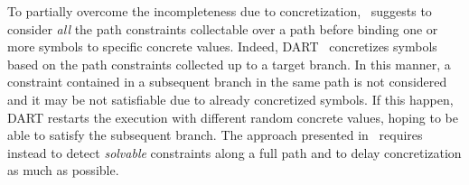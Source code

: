 To partially overcome the incompleteness due to concretization,~\cite{PRV-ISSTA11} suggests to consider {\em all} the path constraints collectable over a path before binding one or more symbols to specific concrete values. Indeed, {\sc DART}~\cite{DART-PLDI05} concretizes symbols based on the path constraints collected up to a target branch. In this manner, a constraint contained in a subsequent branch in the same path is not considered and it may be not satisfiable due to already concretized symbols. If this happen, {\sc DART} restarts the execution with different random concrete values, hoping to be able to satisfy the subsequent branch. The approach presented in~\cite{PRV-ISSTA11} requires instead to detect {\em solvable} constraints along a full path and to delay concretization as much as possible.



